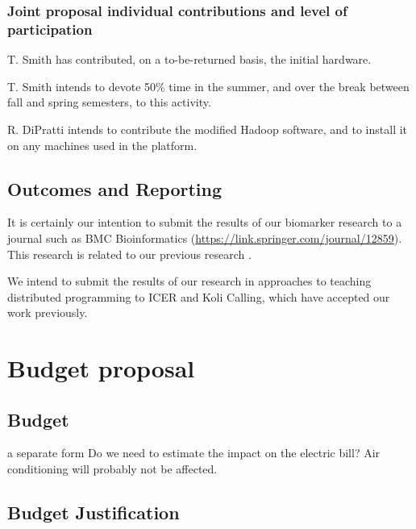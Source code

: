 \documentclass[]{article}
\begin{document}
  \subsubsection{Joint proposal individual contributions and level of participation}
 
 T. Smith has contributed, on a to-be-returned basis, the initial hardware.
 
 T. Smith intends to devote 50\% time in the summer, and over the break between fall and spring semesters, to this activity.
 
 R. DiPratti intends to contribute the modified Hadoop software, and to install it on any machines used in the platform.
 \subsection{Outcomes and Reporting}
 
 It is certainly our intention to submit the results of our biomarker research to a journal such as BMC Bioinformatics (\url{https://link.springer.com/journal/12859}). This research is related to our previous research \cite{ammar2013developing}.
 
 We intend to submit the results of our research in approaches to teaching distributed programming to ICER and Koli Calling, which have accepted our work previously.
 
 \section{Budget proposal}
 \subsection{Budget}
 a separate form
  Do we need to estimate the impact on the electric bill? Air conditioning will probably not be affected.
 \subsection{Budget Justification}
 
\end{document}
